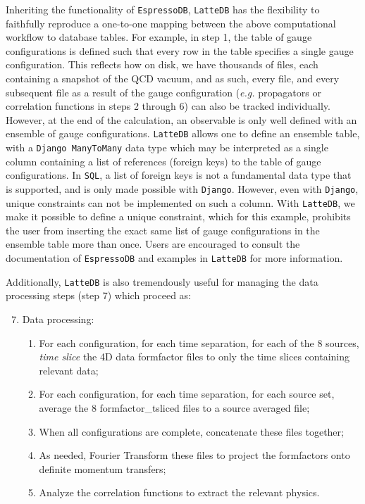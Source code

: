Inheriting the functionality of \texttt{EspressoDB}, \texttt{LatteDB}
has the flexibility to faithfully reproduce a one-to-one mapping between
the above computational workflow to database tables. For example, in
step 1, the table of gauge configurations is defined such that every row
in the table specifies a single gauge configuration. This reflects how
on disk, we have thousands of files, each containing a snapshot of the
QCD vacuum, and as such, every file, and every subsequent file as a
result of the gauge configuration (\emph{e.g.} propagators or
correlation functions in steps 2 through 6) can also be tracked
individually. However, at the end of the calculation, an observable is
only well defined with an ensemble of gauge configurations.
\texttt{LatteDB} allows one to define an ensemble table, with a
\texttt{Django\ ManyToMany} data type which may be interpreted as a
single column containing a list of references (foreign keys) to the
table of gauge configurations. In \texttt{SQL}, a list of foreign keys
is not a fundamental data type that is supported, and is only made
possible with \texttt{Django}. However, even with \texttt{Django},
unique constraints can not be implemented on such a column. With
\texttt{LatteDB}, we make it possible to define a unique constraint,
which for this example, prohibits the user from inserting the exact same
list of gauge configurations in the ensemble table more than once. Users
are encouraged to consult the documentation of \texttt{EspressoDB} and
examples in \texttt{LatteDB} for more information.

Additionally, \texttt{LatteDB} is also tremendously useful for managing
the data processing steps (step 7) which proceed as:

\begin{enumerate}
\setcounter{enumi}{6}\item Data processing:
\begin{enumerate}
\item For each configuration, for each time separation, for each of the 8 sources, \emph{time slice} the 4D data formfactor files to only the time slices containing relevant data;

\item For each configuration, for each time separation, for each source set, average the 8 formfactor\_tsliced files to a source averaged file;

\item When all configurations are complete, concatenate these files together;

\item As needed, Fourier Transform these files to project the formfactors onto definite momentum transfers;

\item Analyze the correlation functions to extract the relevant physics.
\end{enumerate}
\end{enumerate}


